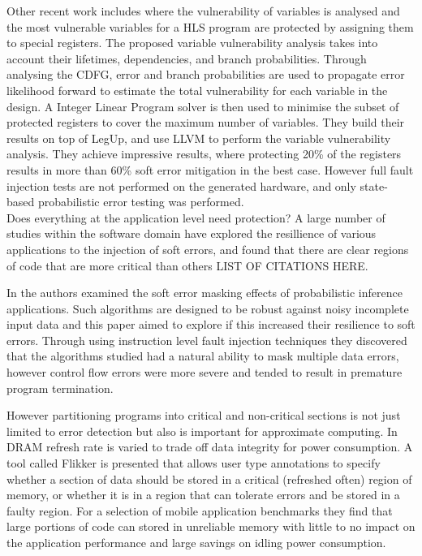 Other recent work includes \cite{chen2014reliability} where the vulnerability of variables is analysed and the most vulnerable
variables for a HLS program are protected by assigning them to special registers.
The proposed variable vulnerability analysis takes into account their lifetimes, dependencies, and branch probabilities.
Through analysing the CDFG, error and branch probabilities are used to propagate error likelihood forward to estimate the total
vulnerability for each variable in the design.
A Integer Linear Program solver is then used to minimise the subset of protected registers to cover the maximum number of variables.
They build their results on top of LegUp, and use LLVM to perform the variable vulnerability analysis.
They achieve impressive results, where protecting 20\% of the registers results in more than 60\% soft error mitigation in the best case.
However full fault injection tests are not performed on the generated hardware, and only state-based probabilistic error testing
was performed.\\

Does everything at the application level need protection?
A large number of studies within the software domain have explored the resillience of various applications
to the injection of soft errors, and found that there are clear regions of code that
are more critical than others LIST OF CITATIONS HERE.

In \cite{wong2006soft} the authors examined the soft error masking effects of probabilistic
inference applications. Such algorithms are designed to be robust against noisy incomplete input
data and this paper aimed to explore if this increased their resilience to soft errors.
Through using instruction level fault injection techniques they discovered that the algorithms
studied had a natural ability to mask multiple data errors, however control flow errors were more
severe and tended to result in premature program termination.

However partitioning programs into critical and non-critical sections is not just limited to 
error detection but also is important for approximate computing.
In \cite{liu2012flikker} DRAM refresh rate is varied to trade off data integrity for power consumption.
A tool called Flikker is presented that allows user type annotations to specify whether a section of
data should be stored in a critical (refreshed often) region of memory, or whether it is in a region that
can tolerate errors and be stored in a faulty region.
For a selection of mobile application benchmarks they find that large portions of code can stored in
unreliable memory with little to no impact on the application performance and large savings on idling
power consumption.


